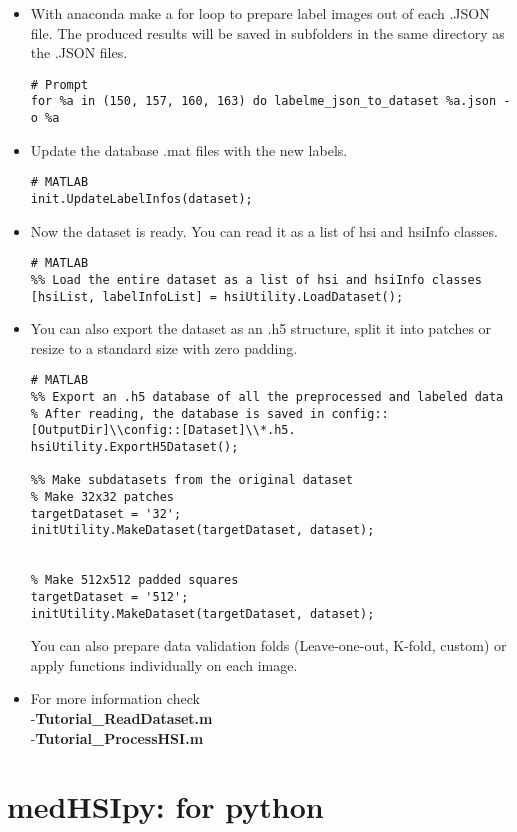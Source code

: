 \documentclass{foxelas_report}
\begin{document}
\begin{enumerate}
\begin{itemize}
\item With anaconda make a for loop to prepare label images out of each .JSON file. The produced results will be saved in subfolders in the same directory as the .JSON files. 

\begin{lstlisting}
# Prompt
for %a in (150, 157, 160, 163) do labelme_json_to_dataset %a.json -o %a
\end{lstlisting}

\item Update the database .mat files with the new labels.

\begin{lstlisting}
# MATLAB
init.UpdateLabelInfos(dataset);
\end{lstlisting}

\item Now the dataset is ready. You can read it as a list of hsi and hsiInfo classes.

\begin{lstlisting}
# MATLAB
%% Load the entire dataset as a list of hsi and hsiInfo classes
[hsiList, labelInfoList] = hsiUtility.LoadDataset();
\end{lstlisting}

\item You can also export the dataset as an .h5 structure, split it into patches or resize to a standard size with zero padding.

\begin{lstlisting}
# MATLAB
%% Export an .h5 database of all the preprocessed and labeled data
% After reading, the database is saved in config::[OutputDir]\\config::[Dataset]\\*.h5.
hsiUtility.ExportH5Dataset();

%% Make subdatasets from the original dataset
% Make 32x32 patches
targetDataset = '32';
initUtility.MakeDataset(targetDataset, dataset);


% Make 512x512 padded squares
targetDataset = '512';
initUtility.MakeDataset(targetDataset, dataset);

\end{lstlisting}

You can also prepare data validation folds (Leave-one-out, K-fold, custom) or apply functions individually on each image. 

\item For more information check \\
-\textbf{Tutorial\_ReadDataset.m}\\
-\textbf{Tutorial\_ProcessHSI.m}
\end{itemize}

\end{enumerate}

\section{medHSIpy: for python}


\end{document}

